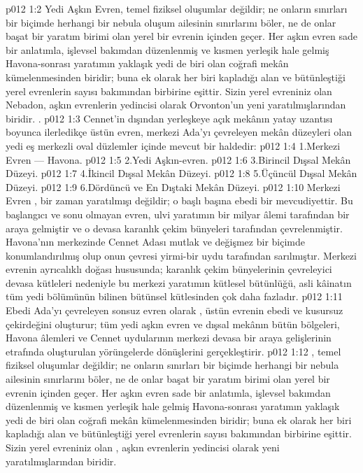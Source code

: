 \vs p012 1:2 Yedi Aşkın Evren, temel fiziksel oluşumlar değildir; ne onların sınırları bir biçimde herhangi bir nebula oluşum ailesinin sınırlarını böler, ne de onlar başat bir yaratım birimi olan yerel bir evrenin içinden geçer. Her aşkın evren sade bir anlatımla, işlevsel bakımdan düzenlenmiş ve kısmen yerleşik hale gelmiş Havona\hyp{}sonrası yaratımın yaklaşık yedi de biri olan coğrafi mekân kümelenmesinden biridir; buna ek olarak her biri kapladığı alan ve bütünleştiği yerel evrenlerin sayısı bakımından birbirine eşittir. Sizin yerel evreniniz olan Nebadon, aşkın evrenlerin yedincisi olarak Orvonton’un yeni yaratılmışlarından biridir. .
\vs p012 1:3 Cennet’in dışından yerleşkeye açık mekânın yatay uzantısı boyunca ilerledikçe üstün evren, merkezi Ada’yı çevreleyen mekân düzeyleri olan yedi eş merkezli oval düzlemler içinde mevcut bir haldedir:
\vs p012 1:4 1.\bibnobreakspace Merkezi Evren --- Havona.
\vs p012 1:5 2.\bibnobreakspace Yedi Aşkın\hyp{}evren.
\vs p012 1:6 3.\bibnobreakspace Birincil Dışsal Mekân Düzeyi.
\vs p012 1:7 4.\bibnobreakspace İkincil Dışsal Mekân Düzeyi.
\vs p012 1:8 5.\bibnobreakspace Üçüncül Dışsal Mekân Düzeyi.
\vs p012 1:9 6.\bibnobreakspace Dördüncü ve En Dıştaki Mekân Düzeyi.
\vs p012 1:10 Merkezi Evren , bir zaman yaratılmışı değildir; o başlı başına ebedi bir mevcudiyettir. Bu başlangıcı ve sonu olmayan evren, ulvi yaratımın bir milyar âlemi tarafından bir araya gelmiştir ve o devasa karanlık çekim bünyeleri tarafından çevrelenmiştir. Havona’nın merkezinde Cennet Adası mutlak ve değişmez bir biçimde konumlandırılmış olup onun çevresi yirmi\hyp{}bir uydu tarafından sarılmıştır. Merkezi evrenin ayrıcalıklı doğası hususunda; karanlık çekim bünyelerinin çevreleyici devasa kütleleri nedeniyle bu merkezi yaratımın kütlesel bütünlüğü, asli kâinatın tüm yedi bölümünün bilinen bütünsel kütlesinden çok daha fazladır.
\vs p012 1:11 Ebedi Ada’yı çevreleyen sonsuz evren olarak , üstün evrenin ebedi ve kusursuz çekirdeğini oluşturur; tüm yedi aşkın evren ve dışsal mekânın bütün bölgeleri, Havona âlemleri ve Cennet uydularının merkezi devasa bir araya gelişlerinin etrafında oluşturulan yörüngelerde dönüşlerini gerçekleştirir.
\vs p012 1:12 , temel fiziksel oluşumlar değildir; ne onların sınırları bir biçimde herhangi bir nebula ailesinin sınırlarını böler, ne de onlar başat bir yaratım birimi olan yerel bir evrenin içinden geçer. Her aşkın evren sade bir anlatımla, işlevsel bakımdan düzenlenmiş ve kısmen yerleşik hale gelmiş Havona\hyp{}sonrası yaratımın yaklaşık yedi de biri olan coğrafi mekân kümelenmesinden biridir; buna ek olarak her biri kapladığı alan ve bütünleştiği yerel evrenlerin sayısı bakımından birbirine eşittir. Sizin yerel evreniniz olan , aşkın evrenlerin yedincisi olarak  yeni yaratılmışlarından biridir.
